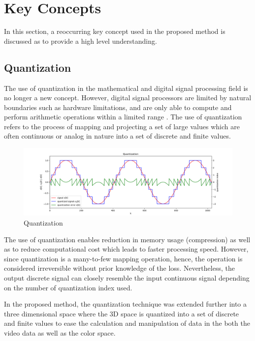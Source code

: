 \section{Key Concepts}
\label{section:keyconcepts}
In this section, a reoccurring key concept used in the proposed method is discussed as to provide a high level understanding. 



\subsection{Quantization}

The use of quantization in the mathematical and digital signal processing field is no longer a new concept. However, digital signal processors are limited by natural boundaries such as hardware limitations, and are only able to compute and perform arithmetic operations within a limited range \cite{spors_2018}. The use of quantization refers to the process of mapping and projecting a set of large values which are often continuous or analog in nature into a set of discrete and finite values. 

\begin{figure}[hbt!]\centering
\includegraphics[width=\textwidth]{image/general/quantization.png}
\caption{Quantization}
\label{fig:framework}
\end{figure}


The use of quantization enables reduction in memory usage (compression) as well as to reduce computational cost which leads to faster processing speed. However, since quantization is a many-to-few mapping operation, hence, the operation is considered irreversible without prior knowledge of the loss. Nevertheless, the output discrete signal can closely resemble the input continuous signal depending on the number of quantization index used.   

In the proposed method, the quantization technique was extended further into a three dimensional space where the 3D space is quantized into a set of discrete and finite values to ease the calculation and manipulation of data in the both the video data as well as the color space. 

